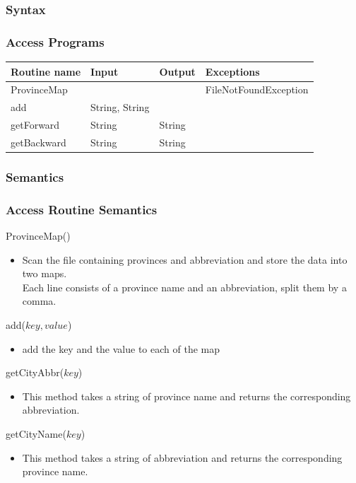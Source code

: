 \documentclass[12pt,fleqn]{article}
\begin{document}
\subsubsection* {Syntax}

\subsubsection* {Access Programs}
\begin{tabular}{| l | l | l | l |}
\hline
\textbf{Routine name} & \textbf{Input} & \textbf{Output} & \textbf{Exceptions}\\
\hline
ProvinceMap & ~ & ~ & FileNotFoundException\\
\hline
add & String, String & ~ & ~\\
\hline
getForward & String & String & ~\\
\hline
getBackward & String & String & ~\\
\hline
\end{tabular}

\subsubsection*{Semantics}
\subsubsection*{Access Routine Semantics}
\noindent ProvinceMap()
\begin{itemize}
\item Scan the file containing provinces and abbreviation and store the data into two maps.\\Each line consists of
a province name and an abbreviation, split them by a comma. 
\end{itemize}
\noindent add($key, value$)
\begin{itemize}
\item add the key and the value to each of the map
\end{itemize}
\noindent getCityAbbr($key$)
\begin{itemize}
\item This method takes a string of province name and returns the corresponding abbreviation.
\end{itemize}
\noindent getCityName($key$)
\begin{itemize}
\item This method takes a string of abbreviation and returns the corresponding province name.
\end{itemize}
\end{document}
